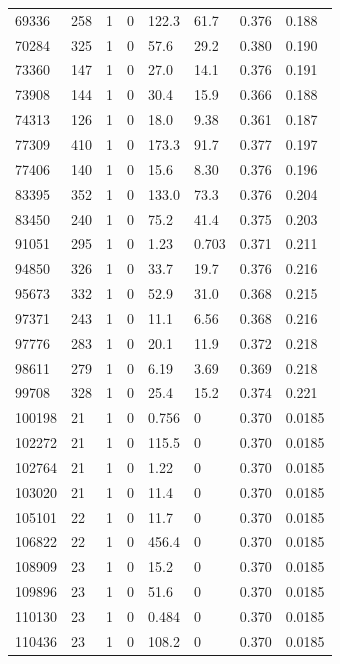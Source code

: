 \documentclass[preview]{standalone}
\begin{document}
{{{{{{{{{{{\begin{tabular}{L{1.2cm}C{1.2cm} C{0.3cm}C{0.5cm} C{1.4cm}C{1.4cm} C{1.4cm}C{1.4cm}}
  69336  &   258  & 1     &  0 &  122.3  & 61.7  & 0.376 &  0.188   \\ 
  70284  &   325  & 1     &  0 &  57.6  & 29.2  & 0.380 &  0.190   \\ 
  73360  &   147  & 1     &  0 &  27.0  & 14.1  & 0.376 &  0.191   \\ 
  73908  &   144  & 1     &  0 &  30.4  & 15.9  & 0.366 &  0.188   \\ 
  74313  &   126  & 1     &  0 &  18.0  & 9.38  & 0.361 &  0.187   \\ 
  77309  &   410  & 1     &  0 &  173.3  & 91.7  & 0.377 &  0.197   \\ 
  77406  &   140  & 1     &  0 &  15.6  & 8.30  & 0.376 &  0.196   \\ 
  83395  &   352  & 1     &  0 &  133.0  & 73.3  & 0.376 &  0.204   \\ 
  83450  &   240  & 1     &  0 &  75.2  & 41.4  & 0.375 &  0.203   \\ 
  91051  &   295  & 1     &  0 &  1.23  & 0.703  & 0.371 &  0.211   \\ 
  94850  &   326  & 1     &  0 &  33.7  & 19.7  & 0.376 &  0.216   \\ 
  95673  &   332  & 1     &  0 &  52.9  & 31.0  & 0.368 &  0.215   \\ 
  97371  &   243  & 1     &  0 &  11.1  & 6.56  & 0.368 &  0.216   \\ 
  97776  &   283  & 1     &  0 &  20.1  & 11.9  & 0.372 &  0.218   \\ 
  98611  &   279  & 1     &  0 &  6.19  & 3.69  & 0.369 &  0.218   \\ 
  99708  &   328  & 1     &  0 &  25.4  & 15.2  & 0.374 &  0.221   \\ 
  100198  &    21  & 1     &  0 &  0.756  & 0  & 0.370 &  0.0185   \\ 
  102272  &    21  & 1     &  0 &  115.5  & 0  & 0.370 &  0.0185   \\ 
  102764  &    21  & 1     &  0 &  1.22  & 0  & 0.370 &  0.0185   \\ 
  103020  &    21  & 1     &  0 &  11.4  & 0  & 0.370 &  0.0185   \\ 
  105101  &    22  & 1     &  0 &  11.7  & 0  & 0.370 &  0.0185   \\ 
  106822  &    22  & 1     &  0 &  456.4  & 0  & 0.370 &  0.0185   \\ 
  108909  &    23  & 1     &  0 &  15.2  & 0  & 0.370 &  0.0185   \\ 
  109896  &    23  & 1     &  0 &  51.6  & 0  & 0.370 &  0.0185   \\ 
  110130  &    23  & 1     &  0 &  0.484  & 0  & 0.370 &  0.0185   \\ 
  110436  &    23  & 1     &  0 &  108.2  & 0  & 0.370 &  0.0185   \\ 
\hline 
\end{tabular} 

}}}}}}}}}}}
\end{document}
